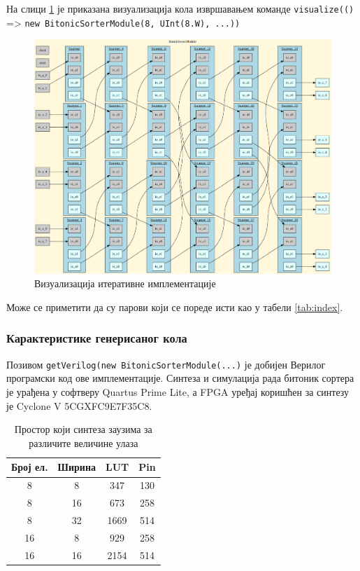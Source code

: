 \documentclass[12pt, a4paper]{article}
\theoremstyle{definition}
\begin{document}
\newpage
На слици \ref{fig:visualizeIter} је приказана визуализација кола извршавањем команде \verb+visualize(()+ => \verb+new BitonicSorterModule(8, UInt(8.W), ...))+

\begin{figure}[H]
  \centering
      \includegraphics[scale=0.3]{slike/visualizeIter}
  \caption{Визуализација итеративне имплементације}
  \label{fig:visualizeIter}
\end{figure}

Може се приметити да су парови који се пореде исти као у табели \ref{tab:index}.

\subsubsection{Карактеристике генерисаног кола}
Позивом \verb+getVerilog(new BitonicSorterModule(...)+ је добијен Верилог програмски код ове имплементације. Синтеза и симулација рада битоник сортера је урађена у софтверу Quartus Prime Lite, а FPGA уређај коришћен за синтезу је Cyclone V 5CGXFC9E7F35C8.

\begin{table}[H]
\centering
 \begin{tabular}{| c | c | c c |}
  \hline
  Број ел. & Ширина & LUT & Pin \\
  \hline
  8 & 8  & 347 & 130 \\
  8 & 16 & 673 & 258 \\
  8 & 32 & 1669 & 514 \\
  \hline
  16 & 8 & 929 & 258 \\
  16 & 16 & 2154 & 514 \\
  \hline
 \end{tabular}
 \caption{Простор који синтеза заузима за различите величине улаза}
 \label{tab:cipSintezaIter}
\end{table}
\end{document}
